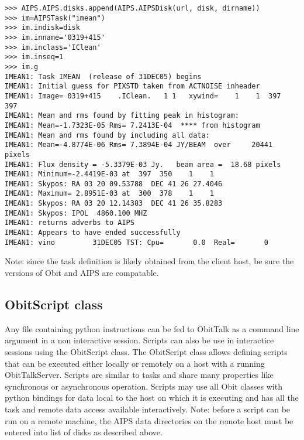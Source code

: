 \documentclass[11pt]{report}
\begin{document}
\begin{verbatim}
>>> AIPS.AIPS.disks.append(AIPS.AIPSDisk(url, disk, dirname))
>>> im=AIPSTask("imean")
>>> im.indisk=disk
>>> im.inname='0319+415'
>>> im.inclass='IClean'
>>> im.inseq=1
>>> im.g
IMEAN1: Task IMEAN  (release of 31DEC05) begins
IMEAN1: Initial guess for PIXSTD taken from ACTNOISE inheader
IMEAN1: Image= 0319+415    .IClean.   1 1   xywind=    1    1  397  397
IMEAN1: Mean and rms found by fitting peak in histogram:
IMEAN1: Mean=-1.7323E-05 Rms= 7.2413E-04  **** from histogram
IMEAN1: Mean and rms found by including all data:
IMEAN1: Mean=-4.8774E-06 Rms= 7.3894E-04 JY/BEAM  over     20441 pixels
IMEAN1: Flux density = -5.3379E-03 Jy.   beam area =  18.68 pixels
IMEAN1: Minimum=-2.4419E-03 at  397  350    1    1
IMEAN1: Skypos: RA 03 20 09.53788  DEC 41 26 27.4046
IMEAN1: Maximum= 2.8951E-03 at  300  378    1    1
IMEAN1: Skypos: RA 03 20 12.14383  DEC 41 26 35.8283
IMEAN1: Skypos: IPOL  4860.100 MHZ
IMEAN1: returns adverbs to AIPS
IMEAN1: Appears to have ended successfully
IMEAN1: vino         31DEC05 TST: Cpu=       0.0  Real=       0
\end{verbatim}


Note: since the task definition is likely  obtained from the client host, be
sure the versions of Obit and AIPS are compatable.

\subsection{ObitScript class}
Any file containing python instructions can be fed to ObitTalk as a
command line argument in a non interactive session.
Scripts can also be use in interactice sessions using the ObitScript class.
The ObitScript class allows defining scripts that can be executed
either locally or remotely on a host with a running ObitTalkServer.
Scripts are similar to tasks and share many properties like
synchronous or asynchronous operation.
Scripts may use all Obit classes with python bindings for data local
to the host on which it is executing and has all the task and remote
data access available interactively.
Note: before a script can be run on a remote machine, the AIPS data directories 
on the remote host must be entered into list of disks as described above.
\end{document}

